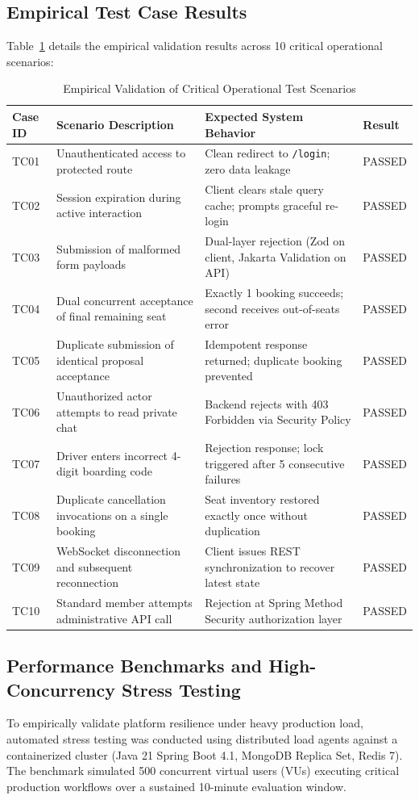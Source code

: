 \documentclass[conference,10pt,a4paper]{IEEEtran}
\begin{document}
\subsection{Empirical Test Case Results}
Table~\ref{tab:test_cases} details the empirical validation results across 10 critical operational scenarios:
\begin{table}[!t]
\caption{Empirical Validation of Critical Operational Test Scenarios}
\label{tab:test_cases}
\centering
\scriptsize
\begin{tabularx}{\textwidth}{lp{5.5cm}Xl}
\toprule
\textbf{Case ID} & \textbf{Scenario Description} & \textbf{Expected System Behavior} & \textbf{Result} \\
\midrule
TC01 & Unauthenticated access to protected route & Clean redirect to \texttt{/login}; zero data leakage & PASSED \\
TC02 & Session expiration during active interaction & Client clears stale query cache; prompts graceful re-login & PASSED \\
TC03 & Submission of malformed form payloads & Dual-layer rejection (Zod on client, Jakarta Validation on API) & PASSED \\
TC04 & Dual concurrent acceptance of final remaining seat & Exactly 1 booking succeeds; second receives out-of-seats error & PASSED \\
TC05 & Duplicate submission of identical proposal acceptance & Idempotent response returned; duplicate booking prevented & PASSED \\
TC06 & Unauthorized actor attempts to read private chat & Backend rejects with 403 Forbidden via Security Policy & PASSED \\
TC07 & Driver enters incorrect 4-digit boarding code & Rejection response; lock triggered after 5 consecutive failures & PASSED \\
TC08 & Duplicate cancellation invocations on a single booking & Seat inventory restored exactly once without duplication & PASSED \\
TC09 & WebSocket disconnection and subsequent reconnection & Client issues REST synchronization to recover latest state & PASSED \\
TC10 & Standard member attempts administrative API call & Rejection at Spring Method Security authorization layer & PASSED \\
\bottomrule
\end{tabularx}
\end{table}

\subsection{Performance Benchmarks and High-Concurrency Stress Testing}
To empirically validate platform resilience under heavy production load, automated stress testing was conducted using distributed load agents against a containerized cluster (Java 21 Spring Boot 4.1, MongoDB Replica Set, Redis 7). The benchmark simulated 500 concurrent virtual users (VUs) executing critical production workflows over a sustained 10-minute evaluation window.
\end{document}
